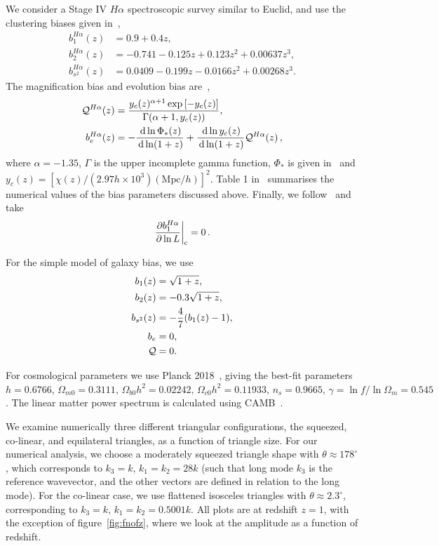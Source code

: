 {We consider a Stage IV \(H\alpha\) spectroscopic survey similar to Euclid, and use the clustering biases given in~\cite{Maartens:2019yhx}, 
\begin{align}
	b^{H\alpha}_1(z) &= 0.9 + 0.4 z,\\
	b^{H\alpha}_2(z) &= -0.741 - 0.125 z + 0.123 z^2 + 0.00637 z^3,\\
	b^{H\alpha}_{s^2}(z) &= 0.0409 - 0.199 z - 0.0166 z^2 + 0.00268 z^3.
\end{align}
The magnification bias and evolution bias are~\cite{Maartens:2019yhx},
\begin{align}
	\Q^{H\alpha}(z) &= \frac{ y_c(z)^{\alpha + 1} \exp\left[-y_c(z)\right] }{\Gamma(\alpha+1, y_c(z))},\\
	b_e^{H\alpha}(z) &= - \frac{\diff \ln \Phi_\ast (z)}{\diff \ln(1+z)} + \frac{\diff \ln y_c(z)}{\diff \ln (1+z)}\Q^{H\alpha}(z)\,,
\end{align}
where \(\alpha = - 1.35\), \(\Gamma\) is the upper incomplete gamma function, \(\Phi_\ast\) is given in~\cite{Maartens:2019yhx} and \(y_c(z) = \left[ \chi(z) / \left( 2.97 h \times 10^3 \right) (\mathrm{Mpc}/h) \right]^2\). Table 1 in~\cite{Maartens:2019yhx} summarises the numerical values of the bias parameters discussed above. Finally, we follow~\cite{Maartens:2019yhx} and take
\begin{equation}
	\evaluat*{\frac{\partial b_1^{H\alpha}}{\partial \ln L}}_\text{c} = 0\,.
\end{equation}


For the simple model of galaxy bias, we use
\begin{align}
	b_1(z) &= \sqrt{1+z}, \\
	b_2(z) &= -0.3 \sqrt{1+z}, \\
	b_{s^2}(z) &= - \frac{4}{7} (b_1(z) -1),\\
	b_e &= 0, \\
	\Q &= 0.
\end{align}

For cosmological parameters we use Planck 2018~\cite{Aghanim:2018eyx}, giving the best-fit parameters \(h = 0.6766,\,\Omega_{m0}=0.3111,\,\Omega_{b0}h^2=0.02242,\,\Omega_{c0}h^2 = 0.11933,\,n_s = 0.9665,\,\gamma = \ln f / \ln \Omega_m = 0.545\). The linear matter power spectrum is calculated using CAMB~\cite{Lewis:1999bs}.

We examine numerically three different triangular configurations, the squeezed, co-linear, and equilateral triangles, as a function of triangle size. For our numerical analysis, we choose a moderately squeezed triangle shape with \(\theta\approx 178^\circ\), which corresponds to \(k_3 = k, \, k_1 = k_2 = 28k\) (such that long mode \(k_3\) is the reference wavevector, and the other vectors are defined in relation to the long mode). For the co-linear case, we use flattened isosceles triangles with \(\theta  \approx 2.3^\circ\), corresponding to \(k_3 = k, \, k_1 = k_2 = 0.5001 k.\) All plots are at redshift \(z=1\), with the exception of figure~\ref{fig:fnofz}, where we look at the amplitude as a function of redshift. 

}
